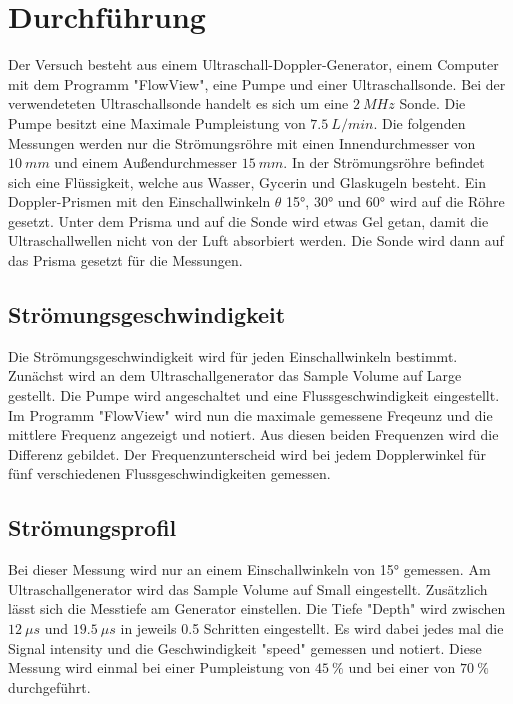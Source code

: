 \section{Durchführung}
\label{sec:Durchführung}
Der Versuch besteht aus einem Ultraschall-Doppler-Generator, einem Computer mit dem Programm "FlowView", eine Pumpe und einer Ultraschallsonde. 
Bei der verwendeteten Ultraschallsonde handelt es sich um eine $\qty{2}{MHz}$ Sonde.
Die Pumpe besitzt eine Maximale Pumpleistung von $\qty{7.5}{L/min}$.
Die folgenden Messungen werden nur die Strömungsröhre mit einen Innendurchmesser von $\qty{10}{mm}$ und einem Außendurchmesser $\qty{15}{mm}$.
In der Strömungsröhre befindet sich eine Flüssigkeit, welche aus Wasser, Gycerin und Glaskugeln besteht.
Ein Doppler-Prismen mit den Einschallwinkeln $\theta $ 15°, 30° und 60° wird auf die Röhre gesetzt.
Unter dem Prisma und auf die Sonde wird etwas Gel getan, damit die Ultraschallwellen nicht von der Luft absorbiert werden.
Die Sonde wird dann auf das Prisma gesetzt für die Messungen.

\subsection{Strömungsgeschwindigkeit}
Die Strömungsgeschwindigkeit wird für jeden Einschallwinkeln bestimmt.
Zunächst wird an dem Ultraschallgenerator das Sample Volume auf Large gestellt.
Die Pumpe wird angeschaltet und eine Flussgeschwindigkeit eingestellt.
Im Programm "FlowView" wird nun die maximale gemessene Freqeunz und die mittlere Frequenz angezeigt und notiert.
Aus diesen beiden Frequenzen wird die Differenz gebildet.
Der Frequenzunterscheid wird bei jedem Dopplerwinkel für fünf verschiedenen Flussgeschwindigkeiten gemessen.

\subsection{Strömungsprofil}
Bei dieser Messung wird nur an einem Einschallwinkeln von 15° gemessen.
Am Ultraschallgenerator wird das Sample Volume auf Small eingestellt.
Zusätzlich lässt sich die Messtiefe am Generator einstellen.
Die Tiefe "Depth" wird zwischen $\qty{12}{\mu s}$ und $\qty{19.5}{\mu s}$ in jeweils 0.5 Schritten eingestellt.
Es wird dabei jedes mal die Signal intensity und die Geschwindigkeit "speed" gemessen und notiert.
Diese Messung wird einmal bei einer Pumpleistung von $\qty{45}{\%}$ und bei einer von $\qty{70}{\%}$ durchgeführt.